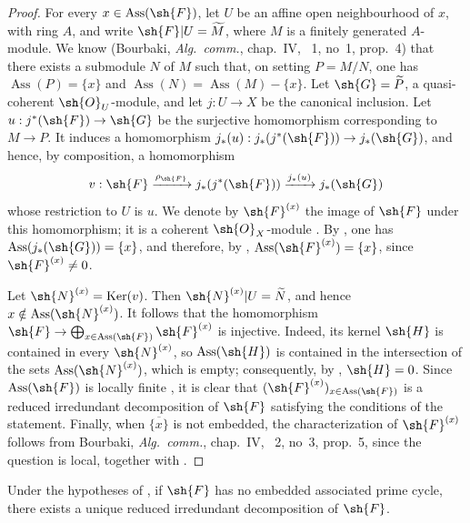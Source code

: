 \begin{proof}
For every $x\in\operatorname{Ass}(\sh{F})$, let $U$ be an affine open neighbourhood of $x$, with ring $A$, and write $\sh{F}|U=\widetilde{M}$, where $M$ is a finitely generated $A$-module.
We know (Bourbaki, \emph{Alg.\ comm.}, chap.~IV, \textsection~1, no~1, prop.~4) that there exists a submodule $N$ of $M$ such that, on setting $P=M/N$, one has $\operatorname{Ass}(P)=\{x\}$ and $\operatorname{Ass}(N)=\operatorname{Ass}(M)-\{x\}$.
Let $\sh{G}=\widetilde{P}$, a quasi-coherent $\sh{O}_U$-module, and let $j:U\to X$ be the canonical inclusion.  Let $u:j^*(\sh{F})\to\sh{G}$ be the surjective homomorphism corresponding to $M\to P$.  It induces a homomorphism $j_*(u):j_*(j^*(\sh{F}))\to j_*(\sh{G})$, and hence, by composition, a homomorphism
\[
v:\sh{F}\xrightarrow{\rho_\sh{F}}j_*(j^*(\sh{F}))\xrightarrow{j_*(u)}j_*(\sh{G})
\]
whose restriction to $U$ is $u$.  We denote by $\sh{F}^{(x)}$ the image of $\sh{F}$ under this homomorphism; it is a coherent $\sh{O}_X$-module .
By , one has $\operatorname{Ass}(j_*(\sh{G}))=\{x\}$, and therefore, by , $\operatorname{Ass}(\sh{F}^{(x)})=\{x\}$, since $\sh{F}^{(x)}\neq 0$.

Let $\sh{N}^{(x)}=\operatorname{Ker}(v)$.  Then $\sh{N}^{(x)}|U=\widetilde{N}$, and hence $x\notin\operatorname{Ass}(\sh{N}^{(x)})$.
It follows that the homomorphism $\sh{F}\to\bigoplus_{x\in\operatorname{Ass}(\sh{F})}\sh{F}^{(x)}$ is injective.  Indeed, its kernel $\sh{H}$ is contained in every $\sh{N}^{(x)}$, so $\operatorname{Ass}(\sh{H})$ is contained in the intersection of the sets $\operatorname{Ass}(\sh{N}^{(x)})$, which is empty; consequently, by , $\sh{H}=0$.
Since $\operatorname{Ass}(\sh{F})$ is locally finite , it is clear that $(\sh{F}^{(x)})_{x\in\operatorname{Ass}(\sh{F})}$ is a reduced irredundant decomposition of $\sh{F}$ satisfying the conditions of the statement.
Finally, when $\overline{\{x\}}$ is not embedded, the characterization of $\sh{F}^{(x)}$ follows from Bourbaki, \emph{Alg.\ comm.}, chap.~IV, \textsection~2, no~3, prop.~5, since the question is local, together with .
\end{proof}


\begin{corollary}[3.2.7]
\label{IV.3.2.7}
Under the hypotheses of , if $\sh{F}$ has no embedded associated prime cycle, there exists a unique reduced irredundant decomposition of $\sh{F}$.
\end{corollary}


